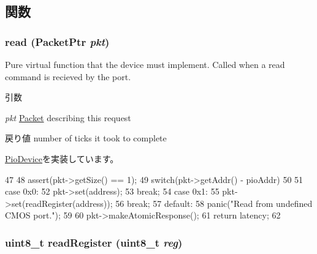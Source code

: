 \subsection{関数}
\hypertarget{classX86ISA_1_1Cmos_a613ec7d5e1ec64f8d21fec78ae8e568e}{
\subsubsection[{read}]{ read ({\bf PacketPtr} {\em pkt})}}
\label{classX86ISA_1_1Cmos_a613ec7d5e1ec64f8d21fec78ae8e568e}
Pure virtual function that the device must implement. Called when a read command is recieved by the port. 
\begin{DoxyParams}{引数}
\item[{\em pkt}]\hyperlink{classPacket}{Packet} describing this request \end{DoxyParams}
\begin{DoxyReturn}{戻り値}
number of ticks it took to complete 
\end{DoxyReturn}


\hyperlink{classPioDevice_a842312590432036092c422c87a442358}{PioDevice}を実装しています。


\begin{DoxyCode}
47 {
48     assert(pkt->getSize() == 1);
49     switch(pkt->getAddr() - pioAddr)
50     {
51       case 0x0:
52         pkt->set(address);
53         break;
54       case 0x1:
55         pkt->set(readRegister(address));
56         break;
57       default:
58         panic("Read from undefined CMOS port.\n");
59     }
60     pkt->makeAtomicResponse();
61     return latency;
62 }
\end{DoxyCode}
\hypertarget{classX86ISA_1_1Cmos_aa6db46255cb370c4b02a204daefb40c2}{
\subsubsection[{readRegister}]{\setlength{\rightskip}{0pt plus 5cm}uint8\_\-t readRegister (uint8\_\-t {\em reg})}}
\label{classX86ISA_1_1Cmos_aa6db46255cb370c4b02a204daefb40c2}



